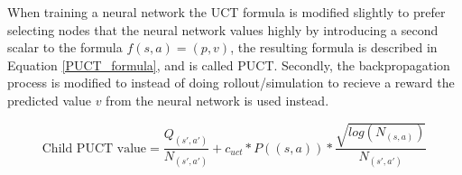 When training a neural network the UCT formula is modified slightly to prefer selecting nodes
that the neural network values highly by introducing a second scalar to the formula $f(s,a) = (p,v)$,
the resulting formula is described in Equation \ref{PUCT_formula}, and is called PUCT. Secondly, the backpropagation process
is modified to instead of doing rollout/simulation to recieve a reward the predicted value $v$ from
the neural network is used instead.

\begin{equation} \label{PUCT_formula}
  \text{Child PUCT value} = \frac{Q_{(s',a')}}{N_{(s',a')}} + c_{uct} * P((s,a)) * \frac{\sqrt{log(N_{(s,a)})}}{N_{(s',a')}}
\end{equation}

